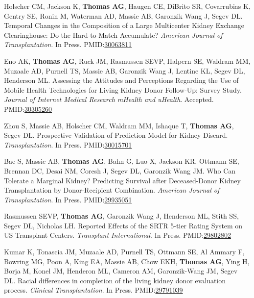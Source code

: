 \documentclass[10pt]{article}
\makeatletter
\newlength{\bibhang}
\newlength{\bibsep}
 {\@listi \global\bibsep\itemsep \global\advance\bibsep by\parsep}
\newenvironment{bibenum*}
  {\renewcommand\labelenumi{[\theenumi]}%
   \etaremune[
     topsep=0pt,
     itemsep=\bibsep,
     parsep=0pt,partopsep=0pt,
     itemindent=-\bibhang,
     leftmargin={\bibhang+\widthof{[999]}}]}
  {\endetaremune}
\newcommand{\pmid}[1]{PMID:\href{https://www.ncbi.nlm.nih.gov/pubmed/#1}{#1}}
\makeatother
\begin{document}
\begin{bibenum*}
\item Holscher CM, Jackson K, \textbf{Thomas AG}, Haugen CE, DiBrito SR,
  Covarrubias K, Gentry SE, Ronin M, Waterman AD, Massie AB,
  Garonzik Wang J, Segev DL.
  Temporal Changes in the Composition of a Large Multicenter Kidney
  Exchange Clearinghouse: Do the Hard-to-Match Accumulate?
  \emph{American Journal of Transplantation}. In Press.
  \pmid{30063811} 

\item Eno AK, \textbf{Thomas AG}, Ruck JM, Rasmussen SEVP,
  Halpern SE, Waldram MM, Muzaale AD, Purnell TS, Massie AB,
  Garonzik Wang J, Lentine KL, Segev DL, Henderson ML.
  Assessing the Attitudes and Perceptions Regarding the Use of Mobile Health Technologies for Living Kidney Donor Follow-Up: Survey Study.
  \emph{Journal of Internet Medical Research mHealth and uHealth}.
  Accepted.
  \pmid{30305260} 

\item Zhou S, Massie AB, Holscher CM, Waldram MM, Ishaque T,
  \textbf{Thomas AG}, Segev DL. Prospective Validation of Prediction
  Model for Kidney Discard.
  \emph{Transplantation}. In Press.
  \pmid{30015701} 

\item Bae S, Massie AB, \textbf{Thomas AG}, Bahn G, Luo X, Jackson KR,
  Ottmann SE, Brennan DC, Desai NM, Coresh J, Segev DL, Garonzik Wang JM.
  Who Can Tolerate a Marginal Kidney? Predicting Survival after
  Deceased-Donor Kidney Transplantation by Donor-Recipient Combination.
  \emph{American Journal of Transplantation}. In Press.
  \pmid{29935051} 

\item Rasmussen SEVP, \textbf{Thomas AG}, Garonzik Wang J,
  Henderson ML, Stith SS, Segev DL, Nicholas LH. Reported Effects
  of the SRTR 5-tier Rating System on US Transplant Centers.
  \emph{Transplant International}. In Press.
  \pmid{29802802} 

\item Kumar K, Tonascia JM, Muzaale AD, Purnell TS, Ottmann SE,
  Al Ammary F, Bowring MG, Poon A, King EA, Massie AB, Chow EKH,
  \textbf{Thomas AG}, Ying H, Borja M, Konel JM, Henderon ML,
  Cameron AM, Garonzik-Wang JM, Segev DL. Racial differences in
  completion of the living kidney donor evaluation process.
  \emph{Clinical Transplantation}. In Press.
  \pmid{29791039} 


\end{bibenum*}
\end{document}
